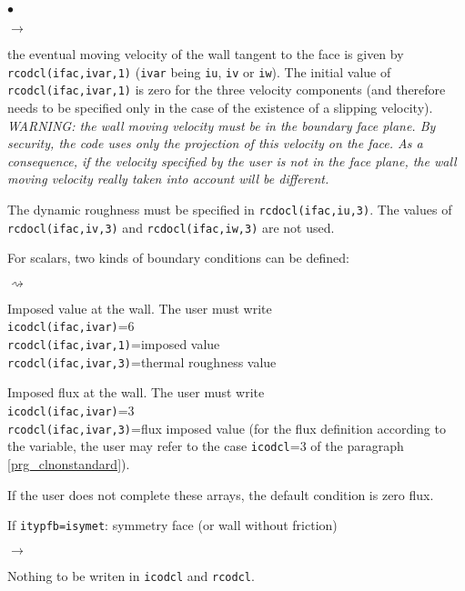 {{{\begin{list}{$\bullet$}{}
\begin{list}{$\rightarrow$}{}
\item the eventual moving velocity of the wall tangent to the face is
      given by \texttt{rcodcl(ifac,ivar,1)} (\texttt{ivar} being
      \texttt{iu}, \texttt{iv} or \texttt{iw}). The initial
      value of \texttt{rcodcl(ifac,ivar,1)} is zero for
      the three velocity components (and therefore needs to be specified
      only in the case of the existence of a slipping velocity). \\
{\em WARNING: the wall moving velocity must be in the boundary face
      plane. By security, the code uses only the projection of this
      velocity on the face. As a consequence, if the velocity specified
      by the user is not in the face plane, the wall moving velocity really
      taken into account will be different.}
\item The dynamic roughness must be specified in \texttt{rcdocl(ifac,iu,3)}.
      The values of \texttt{rcdocl(ifac,iv,3)} and
      \texttt{rcdocl(ifac,iw,3)} are not used.
\item For scalars, two kinds of boundary conditions can be defined:
\begin{list}{$\rightsquigarrow$}{}
\item Imposed value at the wall. The user must write\\
\hspace*{1cm}\texttt{icodcl(ifac,ivar)}=6\\
\hspace*{1cm}\texttt{rcodcl(ifac,ivar,1)}=imposed value\\
\hspace*{1cm}\texttt{rcodcl(ifac,ivar,3)}=thermal roughness value\\
\item Imposed flux at the wall. The user must write\\
\hspace*{1cm}\texttt{icodcl(ifac,ivar)}=3\\
\hspace*{1cm}\texttt{rcodcl(ifac,ivar,3)}=flux imposed value (for the flux
      definition according to the variable, the user may refer to the
      case \texttt{icodcl}=3 of the paragraph \ref{prg_clnonstandard}).
\item If the user does not complete these arrays, the default condition
      is zero flux.
\end{list}
\end{list}
\item If \texttt{itypfb=isymet}: symmetry face (or wall without friction)
\begin{list}{$\rightarrow$}{}
\item Nothing to be writen in \texttt{icodcl} and  \texttt{rcodcl}.
\end{list}


\end{list}}}}
